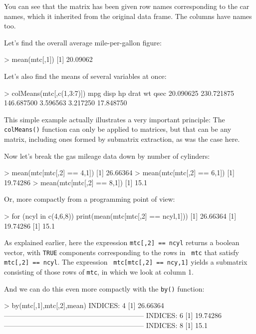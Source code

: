 You can see that the matrix has been given row names corresponding to
the car names, which it inherited from the original data frame.  The
columns have names too.

Let's find the overall average mile-per-gallon figure:

\begin{Code}
> mean(mtc[,1])
[1] 20.09062
\end{Code}

Let's also find the means of several variables at once:

\begin{Code}
> colMeans(mtc[,c(1,3:7)])
       mpg       disp         hp       drat         wt       qsec 
 20.090625 230.721875 146.687500   3.596563   3.217250  17.848750 
\end{Code}

This simple example actually illustrates a very important principle:
The {\tt colMeans()} function can only be applied to matrices, but that
can be any matrix, including ones formed by submatrix extraction, as was
the case here.

Now let's break the gas mileage data down by number of cylinders:

\begin{Code}
> mean(mtc[mtc[,2] == 4,1])
[1] 26.66364
> mean(mtc[mtc[,2] == 6,1])
[1] 19.74286
> mean(mtc[mtc[,2] == 8,1])
[1] 15.1
\end{Code}

Or, more compactly from a programming point of view:

\begin{Code}
> for (ncyl in c(4,6,8)) print(mean(mtc[mtc[,2] == ncyl,1]))
[1] 26.66364
[1] 19.74286
[1] 15.1
\end{Code}

As explained earlier, here the expression {\tt mtc[,2] == ncyl} returns
a boolean vector, with {\tt TRUE} components corresponding to the rows in {\tt
mtc} that satisfy {\tt mtc[,2] == ncyl}.  The expression {\tt
mtc[mtc[,2] == ncy,1]} yields a submatrix consisting of those rows of
{\tt mtc}, in which we look at column 1.

And we can do this even more compactly with the {\tt by()} function:

\begin{Code}
> by(mtc[,1],mtc[,2],mean)
INDICES: 4
[1] 26.66364
------------------------------------------------------------ 
INDICES: 6
[1] 19.74286
------------------------------------------------------------ 
INDICES: 8
[1] 15.1
\end{Code}


